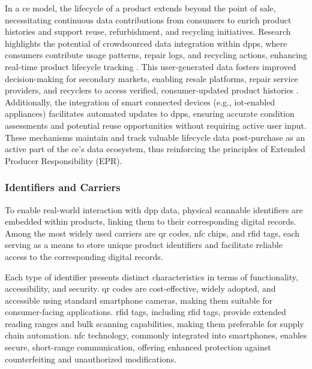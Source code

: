 In a \ac{ce} model, the lifecycle of a product extends beyond the point of sale, necessitating continuous data contributions from consumers to enrich product histories and support reuse, refurbishment, and recycling initiatives. Research highlights the potential of crowdsourced data integration within \ac{dpp}s, where consumers contribute usage patterns, repair logs, and recycling actions, enhancing real-time product lifecycle tracking \autocite{Voulgaridis.2023}. This user-generated data fosters improved decision-making for secondary markets, enabling resale platforms, repair service providers, and recyclers to access verified, consumer-updated product histories \autocite{Koppelaar.2023}. Additionally, the integration of smart connected devices (e.g., \ac{iot}-enabled appliances) facilitates automated updates to \ac{dpp}s, ensuring accurate condition assessments and potential reuse opportunities without requiring active user input. These mechanisms maintain and track valuable lifecycle data post-purchase as an active part of the \ac{ce}’s data ecosystem, thus reinforcing the principles of Extended Producer Responsibility (EPR). 

\subsubsection*{Identifiers and Carriers}
To enable real-world interaction with \ac{dpp} data, physical scannable identifiers are embedded within products, linking them to their corresponding digital records. Among the most widely used carriers are \acrshort{qr} codes, \acrshort{nfc} chips, and \acrshort{rfid} tags, each serving as a means to store unique product identifiers and facilitate reliable access to the corresponding digital records. \autocite{Wan.2025, Ajdinovic.2024}

Each type of identifier presents distinct characteristics in terms of functionality, accessibility, and security. \ac{qr} codes are cost-effective, widely adopted, and accessible using standard smartphone cameras, making them suitable for consumer-facing applications. \ac{rfid} tags, including \ac{rfid} tags, provide extended reading ranges and bulk scanning capabilities, making them preferable for supply chain automation. \ac{nfc} technology, commonly integrated into smartphones, enables secure, short-range communication, offering enhanced protection against counterfeiting and unauthorized modifications. \autocite{ParagonID.n.d., Wan.2025}


